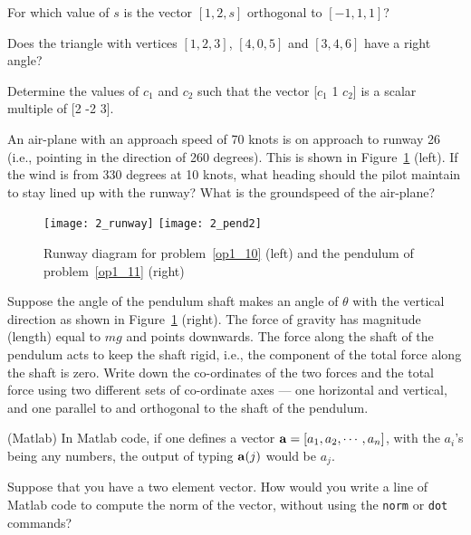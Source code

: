 \begin{problem}
\label{op1_8}
For which value of $s$ is the vector $[1,2,s]$ orthogonal to
$[-1,1,1]$?
\end{problem}

\begin{problem}
\label{op1_9}
Does the triangle with vertices $[1,2,3]$, $[4,0,5]$ and $[3,4,6]$
have a right angle? 
\end{problem}

\begin{problem}
\label{2009_a1_5}
Determine the values of $c_1$ and $c_2$ such that the vector
[$c_1$ 1 $c_2$] is a scalar multiple of [2 -2 3]. 
\end{problem}

\begin{problem}
\label{op1_10}
An air-plane with an approach speed of 70 knots is on approach to
runway 26 (i.e., pointing in the direction of 260 degrees). This 
is shown in Figure~\ref{fig_runway} (left). If the
wind is from 330 degrees at 10 knots, what heading should the pilot
maintain to stay lined up with the runway? What is the groundspeed of
the air-plane?
\end{problem}

\begin{figure}
\centerline{\texttt{[image: 2\_runway]}
\texttt{[image: 2\_pend2]}}
\caption{Runway diagram for problem~\ref{op1_10} (left) and 
the pendulum of problem~\ref{op1_11} (right) \label{fig_runway}}
\end{figure}

\begin{problem}
\label{op1_11}
Suppose the angle of the pendulum shaft makes an angle of $\theta$
with the vertical direction as 
shown in Figure~\ref{fig_runway} (right). The force of gravity has
magnitude (length) equal to $mg$ and points downwards. The force along
the shaft of the pendulum acts to keep the shaft rigid, i.e., the
component of the total force along the shaft is zero. Write down the
co-ordinates of the two forces and the total force using two different
sets of co-ordinate axes --- one horizontal and vertical, and one
parallel to and orthogonal to the shaft of the pendulum.
\end{problem}


\begin{problem}
\label{matlab_op1_11}
(Matlab) In Matlab code, if one defines a vector $\aa=[a_1,a_2,\cdots,a_n]$, with the $a_i$'s being any numbers, the output of typing $\aa(j)$ would be $a_j$.

Suppose that you have a two element vector. How would you write a line of Matlab code to compute the norm of the vector, without using the {\tt norm} or {\tt dot} commands?
\end{problem}

